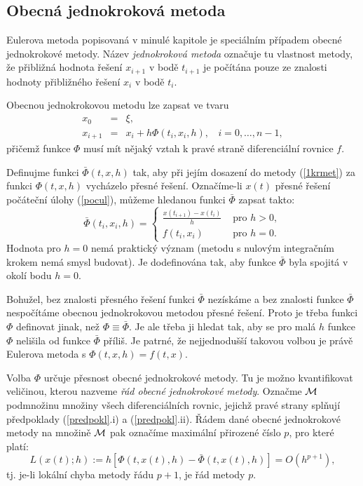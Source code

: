\documentclass[a4paper, 12pt]{book}
\theoremstyle{definition}
\begin{document}
\subsection{Obecná jednokroková metoda}
Eulerova metoda popisovaná v minulé kapitole je speciálním případem obecné 
jednokrokové metody. Název {\em jednokroková metoda} označuje tu vlastnost metody,
že přibližná hodnota řešení $x_{i+1}$ v bodě $t_{i+1}$ je počítána pouze ze 
znalosti hodnoty přibližného řešení $x_i$ v bodě $t_i$.

Obecnou jednokrokovou metodu lze zapsat ve tvaru
\begin{equation}\label{1krmet}
\begin{array}{crl}
x_0 & =& \xi,\\
x_{i+1} &=&x_i+h \Phi(t_i,x_i,h),~~~~ i=0,\dots,n-1,
\end{array}
\end{equation}
přičemž funkce $\Phi$ musí mít nějaký vztah k pravé straně diferenciální rovnice $f$.

Definujme funkci $\bar\Phi(t,x,h)$ tak, aby při jejím dosazení do metody (\ref{1krmet}) 
za funkci $\Phi(t,x,h)$ vycházelo přesné řešení. Označíme-li $x(t)$ přesné řešení 
počáteční úlohy (\ref{pocul}), můžeme hledanou funkci $\bar\Phi$ zapsat takto:
\begin{equation}\label{delta}
\bar\Phi(t_i,x_i,h) = \left\{\begin{array}{ll}
\frac{x(t_{i+1})-x(t_i)}{h}&\mbox { pro }h>0,\\
f(t_i,x_i)&\mbox { pro }h=0.
\end{array}\right.
\end{equation}
Hodnota pro $h=0$ nemá praktický význam (metodu s nulovým integračním krokem nemá 
smysl budovat). Je dodefinována tak, aby funkce $\bar\Phi$ byla spojitá v okolí bodu 
$h=0$.

Bohužel, bez znalosti přesného řešení funkci $\bar\Phi$ nezískáme a bez znalosti funkce 
$\bar\Phi$ nespočítáme obecnou jednokrokovou metodou přesné řešení. Proto je třeba 
funkci $\Phi$ definovat jinak, než $\Phi\equiv\bar\Phi$. Je ale třeba ji hledat tak,
aby se pro malá $h$ funkce $\Phi$ nelišila od funkce $\bar\Phi$ příliš. Je patrné, že
nejjednodušší takovou volbou je právě Eulerova metoda s $\Phi(t,x,h)=f(t,x)$.

Volba $\Phi$ určuje přesnost obecné jednokrokové metody. Tu je možno kvantifikovat
veličinou, kterou nazveme {\em řád obecné jednokrokové metody}. Označme $\cal M$ 
podmnožinu množiny všech diferenciálních rovnic, jejichž pravé strany splňují 
předpoklady (\ref{predpokl}.i) a (\ref{predpokl}.ii). Řádem dané obecné jednokrokové 
metody na množině $\cal M$ pak označíme maximální přirozené číslo $p$, pro které
platí:
\begin{displaymath}
 L(x(t);h):=h[\Phi(t,x(t),h)-\bar\Phi(t,x(t),h)]=O(h^{p+1}),
\end{displaymath}
tj. je-li lokální chyba metody řádu $p+1$, je řád metody $p$.
\end{document}
